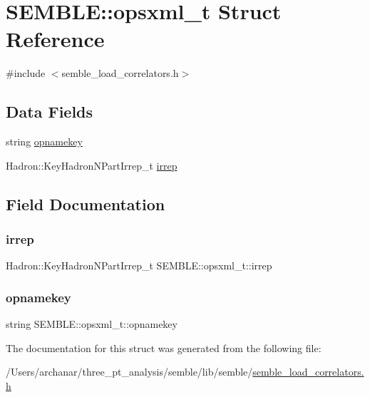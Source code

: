\hypertarget{structSEMBLE_1_1opsxml__t}{}\section{S\+E\+M\+B\+LE\+:\+:opsxml\+\_\+t Struct Reference}
\label{structSEMBLE_1_1opsxml__t}


{\ttfamily \#include $<$semble\+\_\+load\+\_\+correlators.\+h$>$}

\subsection*{Data Fields}
\begin{DoxyCompactItemize}
\item 
string \mbox{\hyperlink{structSEMBLE_1_1opsxml__t_a7265fa37752c9950f3ba34f66920f6e8}{opnamekey}}
\item 
Hadron\+::\+Key\+Hadron\+N\+Part\+Irrep\+\_\+t \mbox{\hyperlink{structSEMBLE_1_1opsxml__t_a88f1396df0a488373f223e768042e949}{irrep}}
\end{DoxyCompactItemize}


\subsection{Field Documentation}
\mbox{\label{structSEMBLE_1_1opsxml__t_a88f1396df0a488373f223e768042e949}} 
\subsubsection{\texorpdfstring{irrep}{irrep}}
{\footnotesize\ttfamily Hadron\+::\+Key\+Hadron\+N\+Part\+Irrep\+\_\+t S\+E\+M\+B\+L\+E\+::opsxml\+\_\+t\+::irrep}

\mbox{\label{structSEMBLE_1_1opsxml__t_a7265fa37752c9950f3ba34f66920f6e8}} 
\subsubsection{\texorpdfstring{opnamekey}{opnamekey}}
{\footnotesize\ttfamily string S\+E\+M\+B\+L\+E\+::opsxml\+\_\+t\+::opnamekey}



The documentation for this struct was generated from the following file\+:\begin{DoxyCompactItemize}
\item 
/\+Users/archanar/three\+\_\+pt\+\_\+analysis/semble/lib/semble/\mbox{\hyperlink{semble__load__correlators_8h}{semble\+\_\+load\+\_\+correlators.\+h}}\end{DoxyCompactItemize}

